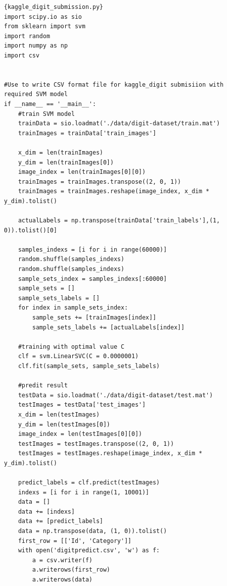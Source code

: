 \documentclass[11pt]{article}
\begin{document}
\newpage
\begin{lstlisting}
{kaggle_digit_submission.py}
import scipy.io as sio
from sklearn import svm
import random
import numpy as np
import csv


#Use to write CSV format file for kaggle_digit submisiion with required SVM model
if __name__ == '__main__':
	#train SVM model
	trainData = sio.loadmat('./data/digit-dataset/train.mat')
	trainImages = trainData['train_images']

	x_dim = len(trainImages)
	y_dim = len(trainImages[0])
	image_index = len(trainImages[0][0])
	trainImages = trainImages.transpose((2, 0, 1))
	trainImages = trainImages.reshape(image_index, x_dim * y_dim).tolist()

	actualLabels = np.transpose(trainData['train_labels'],(1, 0)).tolist()[0]

	samples_indexs = [i for i in range(60000)]
	random.shuffle(samples_indexs)
	random.shuffle(samples_indexs)
	sample_sets_index = samples_indexs[:60000]
	sample_sets = []
	sample_sets_labels = []
	for index in sample_sets_index:
		sample_sets += [trainImages[index]]
		sample_sets_labels += [actualLabels[index]]

	#training with optimal value C
	clf = svm.LinearSVC(C = 0.0000001)
	clf.fit(sample_sets, sample_sets_labels)

	#predit result
	testData = sio.loadmat('./data/digit-dataset/test.mat')
	testImages = testData['test_images']
	x_dim = len(testImages)
	y_dim = len(testImages[0])
	image_index = len(testImages[0][0])
	testImages = testImages.transpose((2, 0, 1))
	testImages = testImages.reshape(image_index, x_dim * y_dim).tolist()

	predict_labels = clf.predict(testImages)
	indexs = [i for i in range(1, 10001)]
	data = []
	data += [indexs]
	data += [predict_labels]
	data = np.transpose(data, (1, 0)).tolist()
	first_row = [['Id', 'Category']]
	with open('digitpredict.csv', 'w') as f:
	    a = csv.writer(f)
	    a.writerows(first_row)
	    a.writerows(data)




\end{lstlisting}
\end{document}
